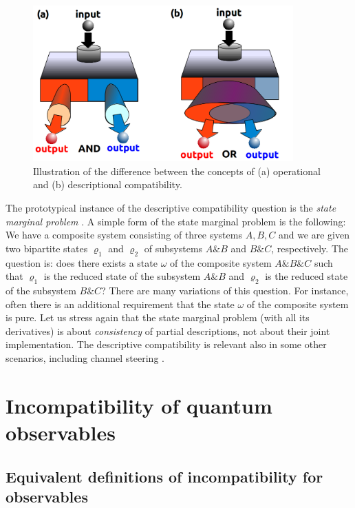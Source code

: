\documentclass[12pt]{article}
\theoremstyle{definition}
\begin{document}
\begin{figure}\begin{center}
\includegraphics[width=10cm]{fig_descriptional.png}
\caption{Illustration of the difference between the concepts of
(a) operational and (b) descriptional compatibility.}
\label{fig:descriptional}
\end{center}
\end{figure}

The prototypical instance of the descriptive compatibility question is the \emph{state marginal problem} \cite{Klyachko04}. 
A simple form of the state marginal problem is the following: We have a composite system consisting of three systems $A,B,C$ and we are given two bipartite states $\varrho_1$ and $\varrho_2$ of subsystems $A\&B$ and $B \& C$, respectively. The question is: does there exists a state $\omega$ of the composite system $A\& B \& C$ such that $\varrho_1$ is the reduced state of the subsystem $A\&B$ and $\varrho_2$ is the reduced state of the subsystem $B \& C$? There are many variations of this question. 
For instance, often there is an additional requirement that the state $\omega$ of the composite system is pure. 
Let us stress again that the state marginal problem (with all its derivatives) is about \emph{consistency} of partial descriptions, not about their joint implementation.
The descriptive compatibility is relevant also in some other scenarios, including channel steering \cite{Piani15}.

\section{Incompatibility of quantum observables}\label{sec:observables}

\subsection{Equivalent definitions of incompatibility for observables}\label{sec:functional}
\end{document}

